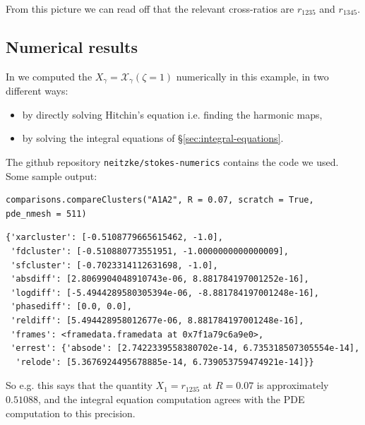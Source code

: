 \documentclass[12pt,letterpaper,reqno]{article}
\numberwithin{equation}{section}
\begin{document}
From this picture we can read off that the 
relevant cross-ratios are $r_{1235}$ and $r_{1345}$.

\subsection{Numerical results}

In \cite{dumas2020opers} we computed the $X_\gamma = \mathcal X_\gamma(\zeta = 1)$ numerically
in this example, in two different ways: 
\begin{itemize}
\item by
directly solving Hitchin's equation i.e. finding
the harmonic maps,
\item
by solving the integral equations of \S\ref{sec:integral-equations}.
\end{itemize}

The github repository {\tt neitzke/stokes-numerics} contains the code we used.
Some sample output:
\begin{verbatim}
comparisons.compareClusters("A1A2", R = 0.07, scratch = True, pde_nmesh = 511)
\end{verbatim}
\begin{verbatim}
{'xarcluster': [-0.5108779665615462, -1.0],
 'fdcluster': [-0.510880773551951, -1.0000000000000009],
 'sfcluster': [-0.7023314112631698, -1.0],
 'absdiff': [2.8069904048910743e-06, 8.881784197001252e-16],
 'logdiff': [-5.4944289580305394e-06, -8.881784197001248e-16],
 'phasediff': [0.0, 0.0],
 'reldiff': [5.494428958012677e-06, 8.881784197001248e-16],
 'frames': <framedata.framedata at 0x7f1a79c6a9e0>,
 'errest': {'absode': [2.7422339558380702e-14, 6.735318507305554e-14],
  'relode': [5.3676924495678885e-14, 6.739053759474921e-14]}}
\end{verbatim}

So e.g. this says that the quantity
$X_1 = r_{1235}$ at $R = 0.07$ is approximately
$0.51088$, and the integral equation computation agrees with the PDE computation 
to this precision.

\printbibliography
\end{document}
